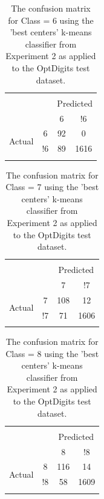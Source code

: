 \documentclass[12pt]{article}
\begin{document}
\begin{table}[!htbp] \centering 
  \caption{The confusion matrix for Class = 6 using the 'best centers' k-means classifier from Experiment 2 as applied to the OptDigits test dataset.} 
  \label{tab:b9} 
\begin{tabular}{lccc} 
\\[-1.8ex]\hline 
\hline \\[-1.8ex] 
\multicolumn{2}{c}{} & \multicolumn{2}{c}{Predicted} \\
\multicolumn{2}{c}{} & 6 & !6\\
\multirow{2}{*}{Actual} & 6 & 92 & 0\\
& !6 & 89 & 1616\\
\hline \\[-1.8ex]
\end{tabular} 
\end{table}

\begin{table}[!htbp] \centering 
  \caption{The confusion matrix for Class = 7 using the 'best centers' k-means classifier from Experiment 2 as applied to the OptDigits test dataset.} 
  \label{tab:b10} 
\begin{tabular}{lccc} 
\\[-1.8ex]\hline 
\hline \\[-1.8ex] 
\multicolumn{2}{c}{} & \multicolumn{2}{c}{Predicted} \\
\multicolumn{2}{c}{} & 7 & !7\\
\multirow{2}{*}{Actual} & 7 & 108 & 12\\
& !7 & 71 & 1606\\
\hline \\[-1.8ex]
\end{tabular} 
\end{table}


\begin{table}[!htbp] \centering 
  \caption{The confusion matrix for Class = 8 using the 'best centers' k-means classifier from Experiment 2 as applied to the OptDigits test dataset.} 
  \label{tab:b11} 
\begin{tabular}{lccc} 
\\[-1.8ex]\hline 
\hline \\[-1.8ex] 
\multicolumn{2}{c}{} & \multicolumn{2}{c}{Predicted} \\
\multicolumn{2}{c}{} & 8 & !8\\
\multirow{2}{*}{Actual} & 8 & 116 & 14\\
& !8 & 58 & 1609\\
\hline \\[-1.8ex]
\end{tabular} 
\end{table}
\end{document}
